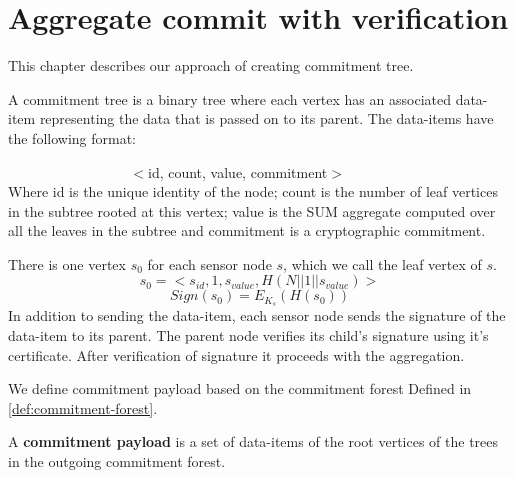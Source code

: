 \chapter{Aggregate commit with verification} %
\label{cha:A Protocol for Commitment Tree Generation}
	
	This chapter describes our approach of creating commitment tree.

	\begin{definition}
		\label{def:data-item}
		A commitment tree is a binary tree where each vertex has an associated data-item representing the data that is passed on to its parent. The data-items have the following format:

		$\hspace{100pt}$ $<$id, count, value, commitment$>$\\
		Where id is the unique identity of the node; count is the number of leaf vertices in the subtree rooted at this vertex; value is the SUM aggregate computed over all the leaves in the subtree and commitment is a cryptographic commitment.
	\end{definition}
	There is one vertex $s_{0}$ for each sensor node $s$, which we call the leaf vertex of $s$. 
	\begin{equation}
		\label{eq:leaf-vertex}
		s_{0} = <s_{id}, 1, s_{value}, H(N||1||s_{value})>
	\end{equation}
	\begin{equation}
		Sign(s_{0}) = E_{K_{s}}(H(s_{0}))
	\end{equation}
	In addition to sending the data-item, each sensor node sends the signature of the data-item to its parent.
	The parent node verifies its child's signature using it's certificate.
	After verification of signature it proceeds with the aggregation.

	We define commitment payload based on the commitment forest Defined in \ref{def:commitment-forest}.
	\begin{definition}
		A \textbf{commitment payload} is a set of data-items of the root vertices of the trees in the outgoing commitment forest.
	\end{definition}

	\newpage
